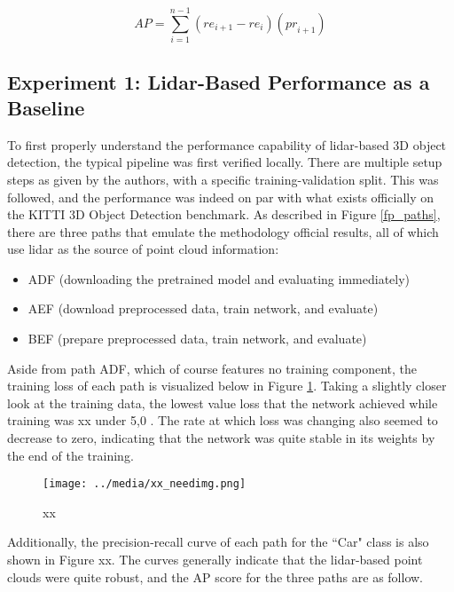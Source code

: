 \begin{equation}
AP = \sum^{n-1}_{i=1} ({re}_{i+1}-{re}_{i})({pr}_{i+1})
\label{eq_ap}
\end{equation}

\subsection{Experiment 1: Lidar-Based Performance as a Baseline}

To first properly understand the performance capability of lidar-based 3D object detection, the typical pipeline was first verified locally. There are multiple setup steps as given by the authors, with a specific training-validation split. This was followed, and the performance was indeed on par with what exists officially on the KITTI 3D Object Detection benchmark. As described in Figure \ref{fp_paths}, there are three paths that emulate the methodology official results, all of which use lidar as the source of point cloud information: 

\begin{itemize} \itemsep=-0.5em
	\item ADF (downloading the pretrained model and evaluating immediately)
	\item AEF (download preprocessed data, train network, and evaluate)
	\item BEF (prepare preprocessed data, train network, and evaluate)
\end{itemize}

Aside from path ADF, which of course features no training component, the training loss of each path is visualized below in Figure \ref{train_lidar_loss}. Taking a slightly closer look at the training data, the lowest value loss that the network achieved while training was xx under 5,0 . The rate at which loss was changing also seemed to decrease to zero, indicating that the network was quite stable in its weights by the end of the training.

\begin{figure}[H]
	\centering
	\texttt{[image: ../media/xx\_needimg.png]}
	\caption{xx}
	\label{train_lidar_loss}
\end{figure}

Additionally, the precision-recall curve of each path for the ``Car" class is also shown in Figure xx. The curves generally indicate that the lidar-based point clouds were quite robust, and the AP score for the three paths are as follow.

